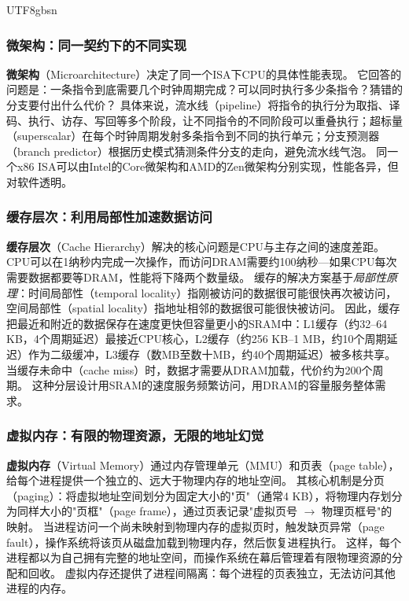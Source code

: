 \documentclass[11pt,a4paper]{article}
\begin{document}
\begin{CJK*}{UTF8}{gbsn}
\subsubsection{微架构：同一契约下的不同实现}

\textbf{微架构}（Microarchitecture）决定了同一个ISA下CPU的具体性能表现。
它回答的问题是：一条指令到底需要几个时钟周期完成？可以同时执行多少条指令？猜错的分支要付出什么代价？
具体来说，流水线（pipeline）将指令的执行分为取指、译码、执行、访存、写回等多个阶段，让不同指令的不同阶段可以重叠执行；超标量（superscalar）在每个时钟周期发射多条指令到不同的执行单元；分支预测器（branch predictor）根据历史模式猜测条件分支的走向，避免流水线气泡。
同一个x86 ISA可以由Intel的Core微架构和AMD的Zen微架构分别实现，性能各异，但对软件透明。

\subsubsection{缓存层次：利用局部性加速数据访问}

\textbf{缓存层次}（Cache Hierarchy）解决的核心问题是CPU与主存之间的速度差距。
CPU可以在1纳秒内完成一次操作，而访问DRAM需要约100纳秒---如果CPU每次需要数据都要等DRAM，性能将下降两个数量级。
缓存的解决方案基于\emph{局部性原理}：时间局部性（temporal locality）指刚被访问的数据很可能很快再次被访问，空间局部性（spatial locality）指地址相邻的数据很可能很快被访问\cite{drepper2007memory}。
因此，缓存把最近和附近的数据保存在速度更快但容量更小的SRAM中：L1缓存（约32--64 KB，4个周期延迟）最接近CPU核心，L2缓存（约256 KB--1 MB，约10个周期延迟）作为二级缓冲，L3缓存（数MB至数十MB，约40个周期延迟）被多核共享。
当缓存未命中（cache miss）时，数据才需要从DRAM加载，代价约为200个周期。
这种分层设计用SRAM的速度服务频繁访问，用DRAM的容量服务整体需求。

\subsubsection{虚拟内存：有限的物理资源，无限的地址幻觉}

\textbf{虚拟内存}（Virtual Memory）通过内存管理单元（MMU）和页表（page table），给每个进程提供一个独立的、远大于物理内存的地址空间。
其核心机制是分页（paging）：将虚拟地址空间划分为固定大小的"页"（通常4 KB），将物理内存划分为同样大小的"页框"（page frame），通过页表记录"虚拟页号 $\to$ 物理页框号"的映射。
当进程访问一个尚未映射到物理内存的虚拟页时，触发缺页异常（page fault），操作系统将该页从磁盘加载到物理内存，然后恢复进程执行\cite{ostep_2023}。
这样，每个进程都以为自己拥有完整的地址空间，而操作系统在幕后管理着有限物理资源的分配和回收。
虚拟内存还提供了进程间隔离：每个进程的页表独立，无法访问其他进程的内存。


\end{CJK*}
\end{document}
